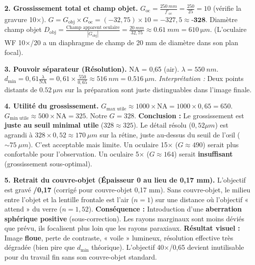 \documentclass[11pt]{article}
\begin{document}
\begin{exoresolu}
\textbf{2. Grossissement total et champ objet.}
$G_{\text{oc}} = \frac{\SI{250}{mm}}{f'_{\text{oc}}} = \frac{250}{25} = 10$ (vérifie la gravure 10×).
$G = G_{\text{obj}} \times G_{\text{oc}} = (-32,75) \times 10 = -327,5 \approx \textbf{-328}$.
Diamètre champ objet $D_{\text{obj}} = \frac{\text{Champ apparent oculaire}}{|G_{\text{obj}}|} = \frac{\SI{20}{mm}}{32,75} \approx \SI{0,61}{mm} = \SI{610}{\micro m}$.
(L'oculaire WF 10×/20 a un diaphragme de champ de 20 mm de diamètre dans son plan focal).

\textbf{3. Pouvoir séparateur (Résolution).}
NA = 0,65 (air). $\lambda = \SI{550}{nm}$.
$d_{\text{min}} = 0,61 \frac{\lambda}{\text{NA}} = 0,61 \times \frac{550}{0,65} \approx \SI{516}{nm} = \SI{0,516}{\micro m}$.
\textit{Interprétation :} Deux points distants de $\SI{0,52}{\micro m}$ sur la préparation sont juste distinguables dans l'image finale.

\textbf{4. Utilité du grossissement.}
$G_{\text{max utile}} \approx 1000 \times \text{NA} = 1000 \times 0,65 = 650$.
$G_{\text{min utile}} \approx 500 \times \text{NA} = 325$.
Notre $G = 328$.
\textbf{Conclusion :} Le grossissement est \textbf{juste au seuil minimal utile} ($328 \approx 325$). Le détail résolu ($0,52 \mu m$) est agrandi à $328 \times 0,52 \approx \SI{170}{\mu m}$ sur la rétine, juste au-dessus du seuil de l'œil ($\sim \SI{75}{\mu m}$). C'est acceptable mais limite. Un oculaire 15× ($G \approx 490$) serait plus confortable pour l'observation. Un oculaire 5× ($G \approx 164$) serait \textbf{insuffisant} (grossissement sous-optimal).

\textbf{5. Retrait du couvre-objet (Épaisseur 0 au lieu de 0,17 mm).}
L'objectif est gravé \textbf{/0,17} (corrigé pour couvre-objet 0,17 mm).
Sans couvre-objet, le milieu entre l'objet et la lentille frontale est l'air ($n=1$) sur une distance où l'objectif « attend » du verre ($n=1,52$).
\textbf{Conséquence :} Introduction d'une \textbf{aberration sphérique positive} (sous-correction). Les rayons marginaux sont moins déviés que prévu, ils focalisent plus loin que les rayons paraxiaux.
\textbf{Résultat visuel :} Image \textbf{floue}, perte de contraste, « voile » lumineux, résolution effective très dégradée (bien pire que $d_{\text{min}}$ théorique). L'objectif 40×/0,65 devient inutilisable pour du travail fin sans son couvre-objet standard.
\end{exoresolu}
\end{document}
